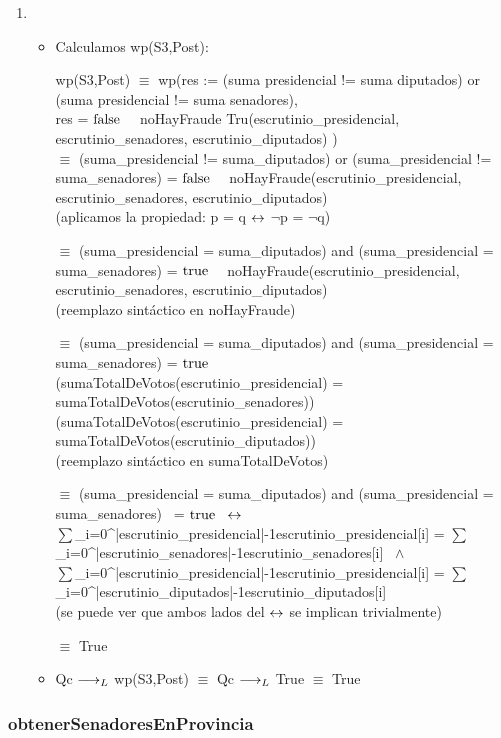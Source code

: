 \documentclass[10pt,a4paper]{article}
\begin{document}
\begin{enumerate}
    

    \item \begin{itemize}
        \item Calculamos wp(S3,Post):

        \vspace{5mm}
        wp(S3,Post) $\equiv$ wp(res := (suma presidencial != suma diputados) or (suma presidencial != suma senadores), \\ res = $\mathrm{false}$ \ \Iff \ noHayFraude Tru(escrutinio\_presidencial, escrutinio\_senadores, escrutinio\_diputados) ) \\

        $\equiv$ (suma\_presidencial != suma\_diputados) or (suma\_presidencial != suma\_senadores) = $\mathrm{false}$ \ \Iff \ noHayFraude(escrutinio\_presidencial, escrutinio\_senadores, escrutinio\_diputados) \\

        (aplicamos la propiedad: p = q $\leftrightarrow$ $\neg$p = $\neg$q)
        
        $\equiv$ (suma\_presidencial = suma\_diputados) and (suma\_presidencial = suma\_senadores) = $\mathrm{true}$ \ \Iff \ noHayFraude(escrutinio\_presidencial, escrutinio\_senadores, escrutinio\_diputados) \\

        (reemplazo sintáctico en noHayFraude)

        $\equiv$ (suma\_presidencial = suma\_diputados) and (suma\_presidencial = suma\_senadores) = $\mathrm{true}$ \ \Iff \\ (sumaTotalDeVotos(escrutinio\_presidencial) = sumaTotalDeVotos(escrutinio\_senadores)) \ \wedge \\ (sumaTotalDeVotos(escrutinio\_presidencial) = sumaTotalDeVotos(escrutinio\_diputados)) \\

        (reemplazo sintáctico en sumaTotalDeVotos)

        $\equiv$ (suma\_presidencial = suma\_diputados) and (suma\_presidencial = suma\_senadores) \ = $\mathrm{true}$ \ $\leftrightarrow$ \\ $\sum$_{i=0}^{|escrutinio\_presidencial|-1}{escrutinio\_presidencial[i]} = $\sum$_{i=0}^{|escrutinio\_senadores|-1}{escrutinio\_senadores[i]} \ $\wedge$ \\ $\sum$_{i=0}^{|escrutinio\_presidencial|-1}{escrutinio\_presidencial[i]} = $\sum$_{i=0}^{|escrutinio\_diputados|-1}{escrutinio\_diputados[i]} \\

        (se puede ver que ambos lados del $\leftrightarrow$ se implican trivialmente)

        $\equiv$ True \\

        \item Qc $\longrightarrow _L$ wp(S3,Post) $\equiv$ Qc $\longrightarrow _L$ True $\equiv$ True
        
    \end{itemize}
    
\end{enumerate}




\subsubsection{obtenerSenadoresEnProvincia}
\end{document}
